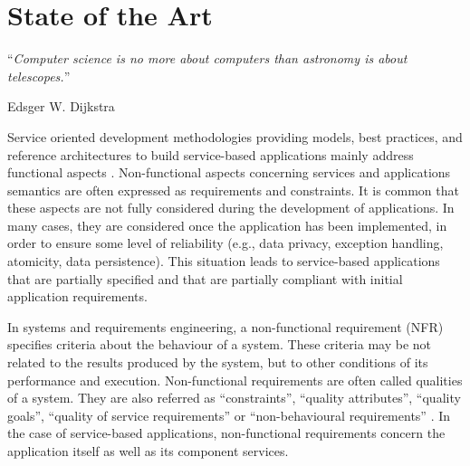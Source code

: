 \chapter{State of the Art}
\label{chap:state_art}
  
\epigraph{``\textit{Computer science is no more about computers than astronomy is
about telescopes.}''}{Edsger W. Dijkstra}
  
 
Service oriented development methodologies providing
models, best practices, and reference architectures to build service-based
applications mainly address functional aspects \cite{sommerville08}. Non-functional aspects concerning services and applications semantics are often
expressed as requirements and constraints.
It is common that these aspects are not fully considered during the
development of applications. In many cases, they are considered once the
application has been implemented, in order to ensure some
level of reliability (e.g., data privacy, exception handling,
atomicity, data persistence). 
This situation leads to service-based
applications that are partially specified and that are
partially compliant with initial application requirements. 


In systems and requirements engineering, a non-functional
requirement (NFR) specifies criteria about the behaviour of a
system. These criteria may be not related to the results produced by the
system, but to other conditions of its performance and execution. 
Non-functional requirements are often called qualities of a system. 
They are also referred as ``constraints'', ``quality attributes'', ``quality goals'', ``quality of
service requirements'' or ``non-behavioural requirements'' \cite{Stellman2005}. 
In the case of service-based applications, non-functional requirements concern
the application itself as well as its component services. 

